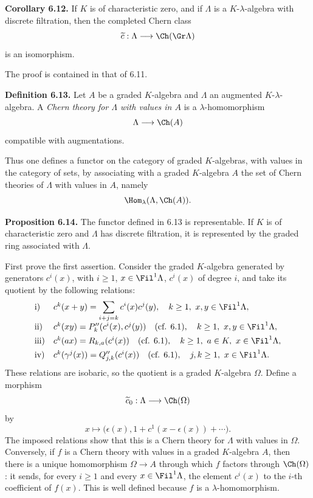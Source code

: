 \textbf{Corollary 6.12.} If \(K\) is of characteristic zero, and if \(\Lambda\) is a \(K\)-\(\lambda\)-algebra with discrete filtration, then the completed Chern class
\[
  \widetilde c:\Lambda\longrightarrow \Ch(\Gr\Lambda)
\]
is an isomorphism.

The proof is contained in that of 6.11.

\textbf{Definition 6.13.} Let \(A\) be a graded \(K\)-algebra and \(\Lambda\) an augmented \(K\)-\(\lambda\)-algebra. A \emph{Chern theory for \(\Lambda\) with values in \(A\)} is a \(\lambda\)-homomorphism
\[
  \Lambda\longrightarrow \Ch(A)
\]
compatible with augmentations.

Thus one defines a functor on the category of graded \(K\)-algebras, with values in the category of sets, by associating with a graded \(K\)-algebra \(A\) the set of Chern theories of \(\Lambda\) with values in \(A\), namely
\[
  \Hom_\lambda(\Lambda,\Ch(A)).
\]

\textbf{Proposition 6.14.} The functor defined in 6.13 is representable. If \(K\) is of characteristic zero and \(\Lambda\) has discrete filtration, it is represented by the graded ring associated with \(\Lambda\).

First prove the first assertion. Consider the graded \(K\)-algebra generated by generators \(c^i(x)\), with \(i\ge1\), \(x\in\Fil^1\Lambda\), \(c^i(x)\) of degree \(i\), and take its quotient by the following relations:
\[
\begin{array}{ll}
\text{i)}&
 c^k(x+y)=\displaystyle\sum_{i+j=k}c^i(x)c^j(y),
 \quad k\ge1,\ x,y\in\Fil^1\Lambda,\\[0.8em]
\text{ii)}&
 c^k(xy)=P''_k(c^i(x),c^j(y))
 \quad(\text{cf. }6.1),
 \quad k\ge1,\ x,y\in\Fil^1\Lambda,\\[0.4em]
\text{iii)}&
 c^k(ax)=R_{k,a}(c^i(x))
 \quad(\text{cf. }6.1),
 \quad k\ge1,\ a\in K,\ x\in\Fil^1\Lambda,\\[0.4em]
\text{iv)}&
 c^k(\gamma^j(x))=Q''_{j,k}(c^i(x))
 \quad(\text{cf. }6.1),
 \quad j,k\ge1,\ x\in\Fil^1\Lambda.
\end{array}
\]
These relations are isobaric, so the quotient is a graded \(K\)-algebra \(\Omega\). Define a morphism
\[
  \widetilde c_0:\Lambda\longrightarrow \Ch(\Omega)
\]
by
\[
  x\longmapsto
  \bigl(\epsilon(x),1+c^1(x-\epsilon(x))+\cdots\bigr).
\]
The imposed relations show that this is a Chern theory for \(\Lambda\) with values in \(\Omega\). Conversely, if \(f\) is a Chern theory with values in a graded \(K\)-algebra \(A\), then there is a unique homomorphism \(\Omega\to A\) through which \(f\) factors through \(\Ch(\Omega)\): it sends, for every \(i\ge1\) and every \(x\in\Fil^1\Lambda\), the element \(c^i(x)\) to the \(i\)-th coefficient of \(f(x)\). This is well defined because \(f\) is a \(\lambda\)-homomorphism.

